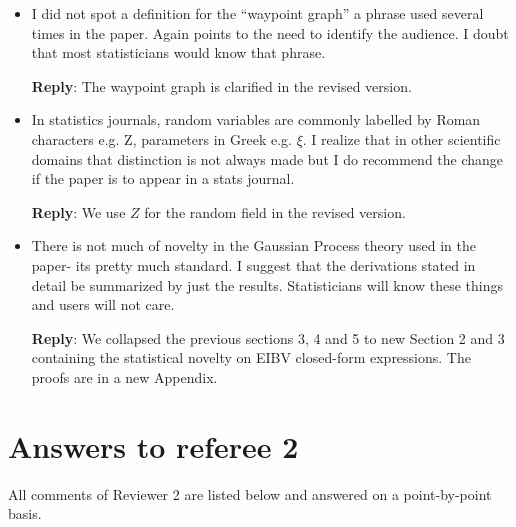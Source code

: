 \documentclass[a4paper]{article}
\def\reply{\textbf{Reply}}
\begin{document}
\begin{answers}
\begin{itemize}[noitemsep,topsep=0pt,parsep=0pt,partopsep=0pt]
\reply: The revised Section 2 contains a general formulation for random sets, which is then exemplified by our ESs for the multivariate process. In the Introduction and Section 2 we motivate the ES for multivariate processes for this application. In many applications it is important to find zones with joint high values of many variables. 

\vspace{1em}

\item I did not spot a definition for the “waypoint graph” a phrase used several times in the paper. Again points to the need to identify the audience. I doubt that most statisticians would know that phrase.\par
\reply: The waypoint graph is clarified in the revised version.  
\vspace{1em}

\item In statistics journals, random variables are commonly labelled by Roman characters e.g. Z, parameters in Greek e.g. $\xi$. I realize that in other scientific domains that distinction is not always made but I do recommend the change if the paper is to appear in a stats journal.\par

\reply: We use $Z$ for the random field in the revised version.
\vspace{1em}

\item There is not much of novelty in the Gaussian Process theory used in the paper- its pretty much standard. I suggest that the derivations stated in detail be summarized by just the results. Statisticians will know these things and users will not care.\par
\reply: We collapsed the previous sections 3, 4 and 5 to new Section 2 and 3 containing the statistical novelty on EIBV closed-form expressions. The proofs are in a new Appendix.

\vspace{1em}

\end{itemize}

\end{answers}


\section*{Answers to referee 2}
All comments of Reviewer 2 are listed below and answered on a point-by-point basis.
\end{document}
